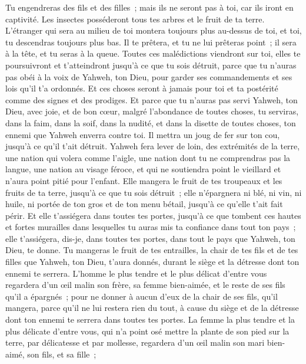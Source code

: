 \begin{multicols}{2}
Tu engendreras des fils et des filles~; mais ils ne seront pas à toi, car ils iront en captivité.
Les insectes posséderont tous tes arbres et le fruit de ta terre.
L'étranger qui sera au milieu de toi montera toujours plus au-dessus de toi, et toi, tu descendras toujours plus bas.
Il te prêtera, et tu ne lui prêteras point~; il sera à la tête, et tu seras à la queue.
Toutes ces malédictions viendront sur toi, elles te poursuivront et t'atteindront jusqu'à ce que tu sois détruit, parce que tu n'auras pas obéi à la voix de Yahweh, ton Dieu, pour garder ses commandements et ses lois qu'il t'a ordonnés.
Et ces choses seront à jamais pour toi et ta postérité comme des signes et des prodiges.
Et parce que tu n'auras pas servi Yahweh, ton Dieu, avec joie, et de bon cœur, malgré l'abondance de toutes choses,
tu serviras, dans la faim, dans la soif, dans la nudité, et dans la disette de toutes choses, ton ennemi que Yahweh enverra contre toi. Il mettra un joug de fer sur ton cou, jusqu'à ce qu'il t'ait détruit.
Yahweh fera lever de loin, des extrémités de la terre, une nation qui volera comme l'aigle, une nation dont tu ne comprendras pas la langue,
une nation au visage féroce, et qui ne soutiendra point le vieillard et n'aura point pitié pour l'enfant.
Elle mangera le fruit de tes troupeaux et les fruits de ta terre, jusqu'à ce que tu sois détruit~; elle n'épargnera ni blé, ni vin, ni huile, ni portée de ton gros et de ton menu bétail, jusqu'à ce qu'elle t'ait fait périr.
Et elle t'assiégera dans toutes tes portes, jusqu'à ce que tombent ces hautes et fortes murailles dans lesquelles tu auras mis ta confiance dans tout ton pays~; elle t'assiégera, dis-je, dans toutes tes portes, dans tout le pays que Yahweh, ton Dieu, te donne.
Tu mangeras le fruit de tes entrailles, la chair de tes fils et de tes filles que Yahweh, ton Dieu, t'aura donnés, durant le siège et la détresse dont ton ennemi te serrera.
L'homme le plus tendre et le plus délicat d'entre vous regardera d'un œil malin son frère, sa femme bien-aimée, et le reste de ses fils qu'il a épargnés~;
pour ne donner à aucun d'eux de la chair de ses fils, qu'il mangera, parce qu'il ne lui restera rien du tout, à cause du siège et de la détresse dont ton ennemi te serrera dans toutes tes portes.
La femme la plus tendre et la plus délicate d'entre vous, qui n'a point osé mettre la plante de son pied sur la terre, par délicatesse et par mollesse, regardera d'un œil malin son mari bien-aimé, son fils, et sa fille~;

\end{multicols}

